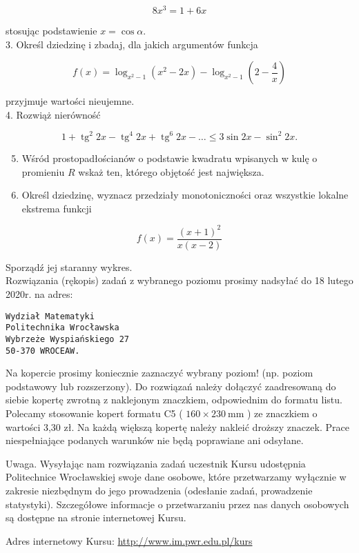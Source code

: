 \documentclass[10pt]{article}
\begin{document}
$$
8 x^{3}=1+6 x
$$

stosując podstawienie $x=\cos \alpha$.\\
3. Określ dziedzinę i zbadaj, dla jakich argumentów funkcja

$$
f(x)=\log _{x^{2}-1}\left(x^{2}-2 x\right)-\log _{x^{2}-1}\left(2-\frac{4}{x}\right)
$$

przyjmuje wartości nieujemne.\\
4. Rozwiąż nierówność

$$
1+\operatorname{tg}^{2} 2 x-\operatorname{tg}^{4} 2 x+\operatorname{tg}^{6} 2 x-\ldots \leqslant 3 \sin 2 x-\sin ^{2} 2 x .
$$

\begin{enumerate}
  \setcounter{enumi}{4}
  \item Wśród prostopadłościanów o podstawie kwadratu wpisanych w kulę o promieniu $R$ wskaż ten, którego objętość jest największa.
  \item Określ dziedzinę, wyznacz przedziały monotoniczności oraz wszystkie lokalne ekstrema funkcji
\end{enumerate}

$$
f(x)=\frac{(x+1)^{2}}{x(x-2)}
$$

Sporządź jej staranny wykres.\\
Rozwiązania (rękopis) zadań z wybranego poziomu prosimy nadsyłać do 18 lutego 2020r. na adres:

\begin{verbatim}
Wydział Matematyki
Politechnika Wrocławska
Wybrzeże Wyspiańskiego 27
50-370 WROCEAW.
\end{verbatim}

Na kopercie prosimy koniecznie zaznaczyć wybrany poziom! (np. poziom podstawowy lub rozszerzony). Do rozwiązań należy dołączyć zaadresowaną do siebie kopertę zwrotną z naklejonym znaczkiem, odpowiednim do formatu listu. Polecamy stosowanie kopert formatu C5 ( $160 \times 230 \mathrm{~mm}$ ) ze znaczkiem o wartości 3,30 zł. Na każdą większą kopertę należy nakleić droższy znaczek. Prace niespełniające podanych warunków nie będą poprawiane ani odsyłane.

Uwaga. Wysyłając nam rozwiązania zadań uczestnik Kursu udostępnia Politechnice Wrocławskiej swoje dane osobowe, które przetwarzamy wyłącznie w zakresie niezbędnym do jego prowadzenia (odesłanie zadań, prowadzenie statystyki). Szczegółowe informacje o przetwarzaniu przez nas danych osobowych są dostępne na stronie internetowej Kursu.

Adres internetowy Kursu: \href{http://www.im.pwr.edu.pl/kurs}{http://www.im.pwr.edu.pl/kurs}
\end{document}
